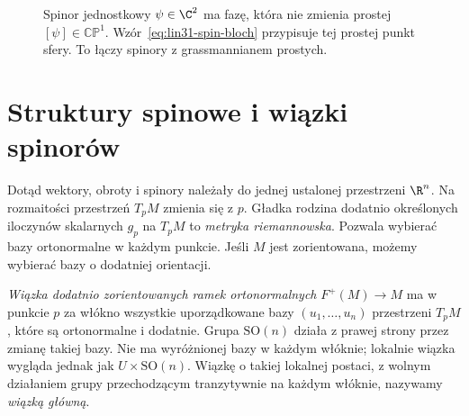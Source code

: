 \begin{figure}[!htbp]
\centering
{}
\caption{Spinor jednostkowy $\psi\in\C^2$ ma fazę,
która nie zmienia prostej $[\psi]\in\mathbb{CP}^1$.
Wzór~\eqref{eq:lin31-spin-bloch} przypisuje tej prostej
punkt sfery. To łączy spinory z grassmannianem prostych.}
\label{fig:lin31-spin-bloch}
\end{figure}

\section{Struktury spinowe i wiązki spinorów}
\label{sec:lin31-struktura-spinowa}

Dotąd wektory, obroty i spinory należały do jednej
ustalonej przestrzeni $\R^n$. Na rozmaitości
przestrzeń $T_pM$ zmienia się z $p$.
Gładka rodzina dodatnio określonych iloczynów
skalarnych $g_p$ na $T_pM$ to \emph{metryka
riemannowska}. Pozwala wybierać bazy ortonormalne
w każdym punkcie. Jeśli $M$ jest zorientowana,
możemy wybierać bazy o dodatniej orientacji.

\emph{Wiązka dodatnio zorientowanych ramek
ortonormalnych} $F^+(M)\to M$ ma w punkcie $p$
za włókno wszystkie uporządkowane bazy
$(u_1,\ldots,u_n)$ przestrzeni $T_pM$,
które są ortonormalne i dodatnie.
Grupa $\mathrm{SO}(n)$ działa z prawej strony
przez zmianę takiej bazy. Nie ma wyróżnionej
bazy w każdym włóknie; lokalnie wiązka wygląda
jednak jak $U\times\mathrm{SO}(n)$.
Wiązkę o takiej lokalnej postaci, z wolnym
działaniem grupy przechodzącym tranzytywnie
na każdym włóknie, nazywamy \emph{wiązką główną}.

